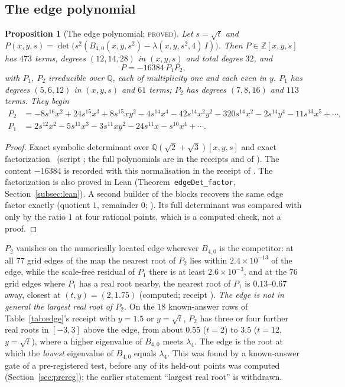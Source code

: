 \documentclass[11pt]{article}
\newtheorem{proposition}[theorem]{Proposition}
\theoremstyle{definition}
\theoremstyle{remark}
\newcommand{\PROVED}{\textsc{proved}}
\begin{document}
\subsection{The edge polynomial}\label{subsec:edgepoly}

\begin{proposition}[The edge polynomial; \PROVED]\label{prop:edgepoly}
Let $s=\sqrt t$ and $P(x,y,s)=\det\bigl(s^2(B_{4,0}(x,y,s^2)-\lambda(x,y,s^2,4)\,I)\bigr)$. Then $P\in\mathbb Z[x,y,s]$ has
$473$ terms, degrees $(12,14,28)$ in $(x,y,s)$ and total degree $32$, and
\[
  P=-16384\,P_1P_2 ,
\]
with $P_1$, $P_2$ irreducible over $\mathbb Q$, each of multiplicity one and each even in $y$. $P_1$ has degrees
$(5,6,12)$ in $(x,y,s)$ and $61$ terms; $P_2$ has degrees $(7,8,16)$ and $113$ terms. They begin
\begin{align*}
  P_2&=-8s^{16}x^2+24s^{15}x^3+8s^{15}xy^2-4s^{14}x^4-42s^{14}x^2y^2-320s^{14}x^2-2s^{14}y^4-11s^{13}x^5+\cdots,\\
  P_1&=2s^{12}x^2-5s^{11}x^3-3s^{11}xy^2-24s^{11}x-s^{10}x^4+\cdots .
\end{align*}
\end{proposition}
\begin{proof}
Exact symbolic determinant over $\mathbb Q(\sqrt2+\sqrt3)[x,y,s]$ and exact factorization~\cite{sympy2017}
(script ; the full polynomials are in the receipts
 and  of ). The content
$-16384$ is recorded with this normalisation in the receipt  of
. The factorization
is also proved in Lean (Theorem~\texttt{edgeDet\_factor}, Section~\ref{subsec:lean}). A second builder of the blocks
recovers the same edge factor exactly (quotient $1$, remainder $0$; ). Its full
determinant was compared with  only by the ratio $1$ at four rational points, which is a
computed check, not a proof.
\end{proof}

$P_2$ vanishes on the numerically located edge wherever $B_{4,0}$ is the competitor: at all $77$ grid edges of the map
the nearest root of $P_2$ lies within $2.4\times10^{-13}$ of the edge, while the scale-free residual of $P_1$ there is at
least $2.6\times10^{-3}$, and at the $76$ grid edges where $P_1$ has a real root nearby, the nearest root of $P_1$ is
$0.13$--$0.67$ away, closest at $(t,y)=(2,1.75)$ (computed; receipt ).
\emph{The edge is not in general the largest real root of $P_2$.} On the $18$ known-answer rows of
Table~\ref{tab:edge}'s receipt with $y=1.5$ or $y=\sqrt t$, $P_2$ has three or four further real roots in $[-3,3]$ above
the edge, from about $0.55$ ($t=2$) to $3.5$ ($t=12$, $y=\sqrt t$), where a higher eigenvalue of $B_{4,0}$ meets
$\lambda_4$. The edge is the root at which the \emph{lowest} eigenvalue of $B_{4,0}$ equals $\lambda_4$. This was found
by a known-answer gate of a pre-registered test, before any of its held-out points was computed
(Section~\ref{sec:prereg}); the earlier statement ``largest real root'' is withdrawn.
\end{document}
